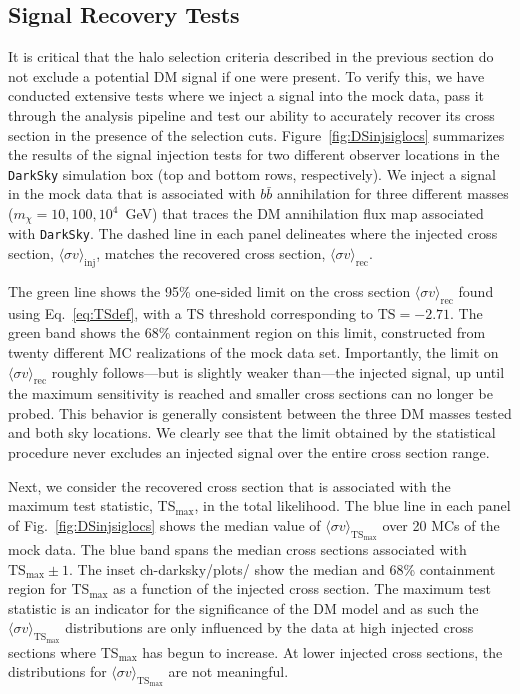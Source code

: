 \subsection{Signal Recovery Tests}
\label{sec:siginj}
 
 It is critical that the halo selection criteria described in the previous section do not exclude a potential DM signal if one were present. To verify this, we have conducted extensive tests where we inject a signal into the mock data, pass it through the analysis pipeline and test our ability to accurately recover its cross section in the presence of the selection cuts.  Figure~\ref{fig:DSinjsiglocs} summarizes the results of the signal injection tests for two different observer locations in the \texttt{DarkSky} simulation box (top and bottom rows, respectively).  We inject a signal in the mock data that is associated with $b\bar{b}$ annihilation for three different masses ($m_\chi = 10, 100, 10^4$~GeV) that traces the DM annihilation flux map associated with \texttt{DarkSky}. The dashed line in each panel delineates where the injected cross section, $\langle \sigma v \rangle_\text{inj}$, matches the recovered cross section, $\langle \sigma v \rangle_\text{rec}$.  

The green line shows the 95\% one-sided limit on the cross section $\langle \sigma v \rangle_\text{rec}$ found using Eq.~\ref{eq:TSdef}, with a TS threshold corresponding to $\text{TS} = -2.71$.  The green band shows the 68\% containment region on this limit, constructed from twenty different MC realizations of the mock data set.  Importantly, the limit on $\langle \sigma v \rangle_\text{rec}$ roughly follows---but is slightly weaker than---the injected signal, up until the maximum sensitivity is reached and smaller cross sections can no longer be probed.  This behavior is generally consistent between the three DM masses tested and both sky locations.  We clearly see that the limit obtained by the statistical procedure never excludes an injected signal over the entire cross section range. 

Next, we consider the recovered cross section that is associated with the maximum test statistic, TS$_\text{max}$, in the total likelihood. The blue line in each panel of Fig.~\ref{fig:DSinjsiglocs} shows the median value of $\langle \sigma v\rangle_{\text{TS}_\text{max}}$ over 20 MCs of the mock data.  The blue band spans the median cross sections associated with $\text{TS}_\text{max}\pm1$.  The inset ch-darksky/plots/ show the median and 68\% containment region for TS$_\text{max}$ as a function of the injected cross section.  The maximum test statistic is an indicator for the significance of the DM model and as such the $\langle \sigma v\rangle_{\text{TS}_\text{max}}$ distributions are only influenced by the data at high injected cross sections where TS$_\text{max}$ has begun to increase.  At lower injected cross sections, the distributions for $\langle \sigma v\rangle_{\text{TS}_\text{max}}$ are not meaningful.  

